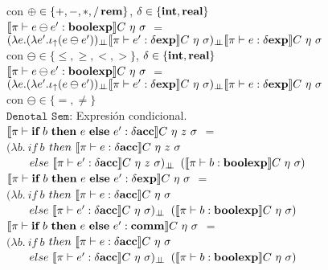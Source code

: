 con $\oplus \in \{ +,-,*,/\,\textbf{rem} \}$, $\delta \in \{\textbf{int},\textbf{real}\}$\\

$\llbracket  \pi \vdash e \ominus e' : \textbf{boolexp}  \rrbracket C \ \eta \ \sigma$ 
$=$ \\
\indent \indent \indent 
$(\lambda e . (\lambda e' . \iota_{\uparrow} (e \ominus e'))_{\bot \!\!\! \bot}
\llbracket \pi \vdash e' : \delta \textbf{exp} \rrbracket C \ \eta \ \sigma)_{\bot \!\!\! \bot}
\llbracket \pi \vdash e : \delta \textbf{exp} \rrbracket C \ \eta \ \sigma$\\

con $\ominus \in \{\leq,\geq,<,> \}$, $\delta \in \{\textbf{int},\textbf{real}\}$\\

$\llbracket  \pi \vdash e \ominus e' : \textbf{boolexp}  \rrbracket C \ \eta \ \sigma$ 
$=$ \\
\indent \indent \indent 
$(\lambda e . (\lambda e' . \iota_{\uparrow} (e \ominus e'))_{\bot \!\!\! \bot}
\llbracket \pi \vdash e' : \delta \textbf{exp} \rrbracket C \ \eta \ \sigma)_{\bot \!\!\! \bot}
\llbracket \pi \vdash e : \delta \textbf{exp} \rrbracket C \ \eta \ \sigma$\\

con $\ominus \in \{=,\neq\}$\\

\noindent
$\texttt{Denotal Sem:}$ Expresi\'on condicional.\\

$\llbracket  \pi \vdash \textbf{if} \ b \ \textbf{then} \ e \ \textbf{else} \ e': \delta \textbf{acc} \rrbracket C \ \eta \ z \ \sigma$ 
$=$ \\
\indent \indent \indent 
$(\lambda b . \ if \ b $ $then \ \llbracket  \pi \vdash e : \delta \textbf{acc} \rrbracket C \ \eta \ z \ \sigma$\\
\indent \indent \indent \indent \indent \ \ \ \
$else \ \llbracket  \pi \vdash e' : \delta \textbf{acc} \rrbracket C \ \eta \ z \ \sigma)_{\bot \!\!\! \bot}$ 
$(\semBrcks{ \pi \vdash b : \boolexp}C \ \eta \ \sigma)$\\

$\llbracket  \pi \vdash \textbf{if} \ b \ \textbf{then} \ e \ \textbf{else} \ e': \delta \textbf{exp} \rrbracket C \ \eta \ \sigma$ 
$=$ \\
\indent \indent \indent 
$(\lambda b . \ if \ b $ $then \ \llbracket  \pi \vdash e : \delta \textbf{acc} \rrbracket C \ \eta \ \sigma$\\
\indent \indent \indent \indent \indent \ \ \ \
$else \ \llbracket  \pi \vdash e' : \delta \textbf{acc} \rrbracket C \ \eta \ \sigma)_{\bot \!\!\! \bot}$ 
$(\semBrcks{ \pi \vdash b : \boolexp}C \ \eta \ \sigma)$\\

$\llbracket  \pi \vdash \textbf{if} \ b \ \textbf{then} \ e \ \textbf{else} \ e': \textbf{comm} \rrbracket C \ \eta \ \sigma$ 
$=$ \\
\indent \indent \indent 
$(\lambda b . \ if \ b $ $then \ \llbracket  \pi \vdash e : \delta \textbf{acc} \rrbracket C \ \eta \ \sigma$\\
\indent \indent \indent \indent \indent \ \ \ \
$else \ \llbracket  \pi \vdash e' : \delta \textbf{acc} \rrbracket C \ \eta \ \sigma)_{\bot \!\!\! \bot}$ 
$(\semBrcks{ \pi \vdash b : \boolexp}C \ \eta \ \sigma)$\\

